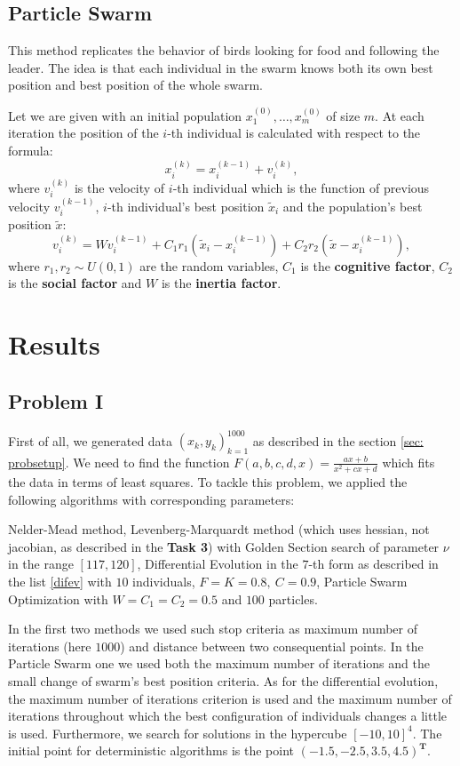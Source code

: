 \documentclass[12pt, bachelor, substylefile = algo_title.rtx]{disser}
\theoremstyle{definition}
\begin{document}
\subsection{Particle Swarm}
This method replicates the behavior of birds looking for food and following the leader. The idea is that each individual in the swarm knows both its own best position and best position of the whole swarm.

Let we are given with an initial population $x^{(0)}_1, \dots, x^{(0)}_m$ of size $m$. At each iteration the position of the $i$-th individual is calculated with respect to the formula: 
\[ x^{(k)}_i = x^{(k-1)}_i + v^{(k)}_i, \]
where $v^{(k)}_i$ is the velocity of $i$-th individual which is the function of previous velocity $v^{(k-1)}_i$, $i$-th individual's best position $\widetilde{x}_i$ and the population's best position $\widetilde{x}$:
\[ v^{(k)}_i =  W v^{(k-1)}_i + C_1 r_1 (\widetilde{x}_i - x^{(k-1)}_i) + C_2 r_2(\widetilde{x} - x^{(k-1)}_i),\]
where $r_1,r_2 \sim U(0, 1)$ are the random variables, $C_1$ is the \textbf{cognitive factor}, $C_2$ is the \textbf{social factor} and $W$ is the \textbf{inertia factor}.

\section{Results}
\subsection{Problem I}
First of all, we generated data $(x_k, y_k)_{k=1}^{1000}$ as described in the section \ref{sec: probsetup}. We need to find the function $F(a, b, c ,d, x) = \frac{ax+b}{x^2+cx+d}$ which fits the data in terms of least squares. To tackle this problem, we applied the following algorithms with corresponding parameters:
\begin{outline}
\1 Nelder-Mead method,
\1 Levenberg-Marquardt method (which uses hessian, not jacobian, as described in the \textbf{Task 3}) with Golden Section search of parameter $\nu$ in the range $[117, 120]$,
\1 Differential Evolution in the $7$-th form as described in the list \ref{difev} with $10$ individuals, $F = K = 0.8,\ C = 0.9$,
\1 Particle Swarm Optimization with $W = C_1 = C_2 = 0.5$ and $100$ particles.
\end{outline}
In the first two methods we used such stop criteria as maximum number of iterations (here $1000$) and distance between two consequential points. In the Particle Swarm one we used both the maximum number of iterations and the small change of swarm's best position criteria. As for the differential evolution, the maximum number of iterations criterion is used and the maximum number of iterations throughout which the best configuration of individuals changes a little is used. Furthermore, we search for solutions in the hypercube $[-10, 10]^4$. The initial point for deterministic algorithms is the point $(-1.5, -2.5, 3.5, 4.5)^{\mathbf{T}}$.
\end{document}
